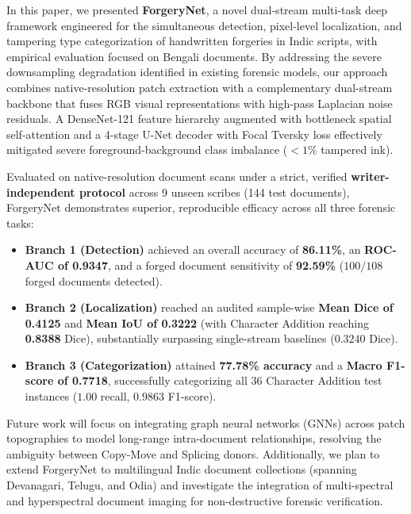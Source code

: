 \documentclass[pdflatex,sn-mathphys-num,iicol]{sn-jnl}
\begin{document}
In this paper, we presented \textbf{ForgeryNet}, a novel dual-stream multi-task deep framework engineered for the simultaneous detection, pixel-level localization, and tampering type categorization of handwritten forgeries in Indic scripts, with empirical evaluation focused on Bengali documents. By addressing the severe downsampling degradation identified in existing forensic models, our approach combines native-resolution patch extraction with a complementary dual-stream backbone that fuses RGB visual representations with high-pass Laplacian noise residuals. A DenseNet-121 feature hierarchy augmented with bottleneck spatial self-attention and a 4-stage U-Net decoder with Focal Tversky loss effectively mitigated severe foreground-background class imbalance ($<1\%$ tampered ink).

Evaluated on native-resolution document scans under a strict, verified \textbf{writer-independent protocol} across 9 unseen scribes (144 test documents), ForgeryNet demonstrates superior, reproducible efficacy across all three forensic tasks:
\begin{itemize}
    \item \textbf{Branch 1 (Detection)} achieved an overall accuracy of \textbf{86.11\%}, an \textbf{ROC-AUC of 0.9347}, and a forged document sensitivity of \textbf{92.59\%} ($100/108$ forged documents detected).
    \item \textbf{Branch 2 (Localization)} reached an audited sample-wise \textbf{Mean Dice of 0.4125} and \textbf{Mean IoU of 0.3222} (with Character Addition reaching \textbf{0.8388} Dice), substantially surpassing single-stream baselines ($0.3240$ Dice).
    \item \textbf{Branch 3 (Categorization)} attained \textbf{77.78\% accuracy} and a \textbf{Macro F1-score of 0.7718}, successfully categorizing all 36 Character Addition test instances ($1.00$ recall, $0.9863$ F1-score).
\end{itemize}

Future work will focus on integrating graph neural networks (GNNs) across patch topographies to model long-range intra-document relationships, resolving the ambiguity between Copy-Move and Splicing donors. Additionally, we plan to extend ForgeryNet to multilingual Indic document collections (spanning Devanagari, Telugu, and Odia) and investigate the integration of multi-spectral and hyperspectral document imaging for non-destructive forensic verification.

\backmatter

\end{document}
